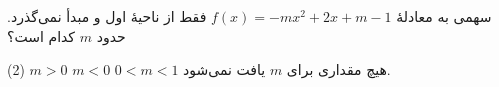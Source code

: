 \begin{example}
سهمی به معادلهٔ \(f(x)=-mx^2+2x+m-1\) فقط از ناحیهٔ اول و مبدأ نمی‌گذرد.
حدود \(m\) کدام است؟
\begin{tasks}(2)
    \task \(m>0\)
    \task \(m<0\)
    \task \(0<m<1\)
    \task هیچ مقداری برای \(m\) یافت نمی‌شود.
\end{tasks}
\end{example}
